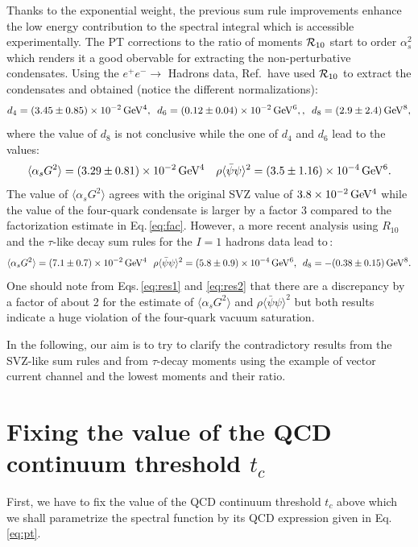 \documentclass[review]{elsarticle}
\def\beq{\begin{equation}}
\def\eeq{\end{equation}}
\def\la{\langle}
\def\ra{\rangle}
\begin{document}
Thanks to the exponential weight, the previous sum rule improvements enhance the low energy contribution to the spectral integral which is accessible experimentally. The PT corrections to the ratio of moments ${\cal R}_{10}$ start to order $\alpha_s^2$ which renders it a good obervable for extracting the non-perturbative condensates.  Using the $e^+e^-\to $ Hadrons data, Ref.\,\cite{LNT} have used ${\cal R}_{10}$
to extract the condensates and obtained (notice the different normalizations):
\beq
d_4=(3.45\pm 0.85)\times 10^{-2}\,{\rm GeV^4},\,\,\,  d_6=(0.12\pm 0.04)\times 10^{-2}\,{\rm GeV^6},,\,\,\,  d_8=(2.9\pm 2.4)\,{\rm GeV^8},
\eeq
where the value of $d_8$ is not conclusive while the one of $d_4$ and $d_6$ lead to the values:
\beq
\la\alpha_s G^2\ra= (3.29\pm 0.81)\times 10^{-2}\,{\rm GeV^4}\,\,\,\,\,\, \rho\la\bar\psi\psi\ra^2=(3.5\pm 1.16)\times 10^{-4}\,{\rm GeV^6}.
\label{eq:res1}
\eeq
The value of $\la\alpha_s G^2\ra$ agrees with the original SVZ\cite{SVZa} value of $3.8\times 10^{-2}\,{\rm GeV^4}$ while the value of the four-quark condensate is larger by a factor 3 compared to the factorization estimate in Eq.\,\ref{eq:fac}. However, a more recent analysis using $R_{10}$ and the $\tau$-like decay sum rules for the $I=1$ hadrons data lead to\,\cite{SN95,SNTAU}:
\beq
\la\alpha_s G^2\ra= (7.1\pm 0.7)\times 10^{-2}\,{\rm GeV^4}\,\,\,\, \rho\la\bar\psi\psi\ra^2=(5.8\pm 0.9)\times 10^{-4}\,{\rm GeV^6},\,\,\,  d_8=-(0.38\pm 0.15)\,{\rm GeV^8}.
\label{eq:res2}
\eeq
One should note from Eqs.\,\ref{eq:res1} and \ref{eq:res2} that there are a discrepancy by a factor of about 2 for the estimate of $\la\alpha_s G^2\ra$ and $\rho\la\bar\psi\psi\ra^2$ but both results indicate a huge violation of the four-quark vacuum saturation.

In the following, our aim is to try to clarify the contradictory results from the SVZ-like sum rules and from $\tau$-decay moments using  the example of vector current channel and the lowest moments and their ratio. 

\vspace*{-0.3cm}
\section{Fixing the value of the QCD continuum threshold $t_c$}
\vspace*{-0.20cm}
First, we have to fix the value of the QCD continuum threshold $t_c$ above  which we shall parametrize the spectral function
by its QCD expression given in Eq.\,\ref{eq:pt}. 
\end{document}
